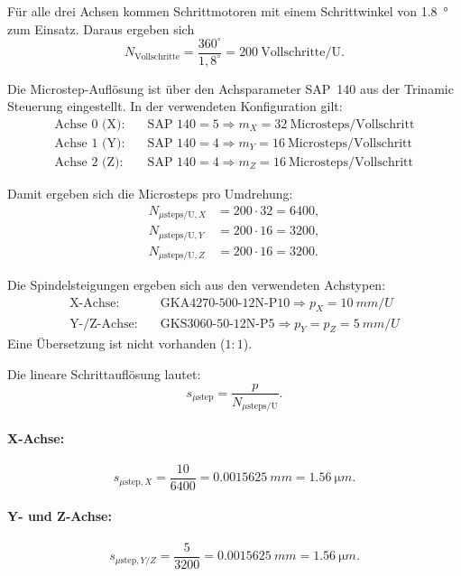 Für alle drei Achsen kommen Schrittmotoren mit einem Schrittwinkel von \SI{1,8}{\degree} zum Einsatz.
Daraus ergeben sich
\begin{equation}
N_\text{Vollschritte}=\frac{360^\circ}{1,8^\circ}=200\ \text{Vollschritte/U}.
\end{equation}

Die Microstep-Auflösung ist über den Achsparameter SAP~140 aus der Trinamic Steuerung eingestellt. In der verwendeten Konfiguration gilt:
\begin{align}
\text{Achse 0 (X):} \quad & \text{SAP 140} = 5 \Rightarrow m_X = 32\ \text{Microsteps/Vollschritt} \\
\text{Achse 1 (Y):} \quad & \text{SAP 140} = 4 \Rightarrow m_Y = 16\ \text{Microsteps/Vollschritt} \\
\text{Achse 2 (Z):} \quad & \text{SAP 140} = 4 \Rightarrow m_Z = 16\ \text{Microsteps/Vollschritt}
\end{align}

Damit ergeben sich die Microsteps pro Umdrehung:
\begin{align}
N_{\mu\text{steps/U},X} &= 200\cdot 32 = 6400,\\
N_{\mu\text{steps/U},Y} &= 200\cdot 16 = 3200,\\
N_{\mu\text{steps/U},Z} &= 200\cdot 16 = 3200.
\end{align}

Die Spindelsteigungen ergeben sich aus den verwendeten Achstypen:
\begin{align}
\text{X-Achse:} \quad & \text{GKA4270-500-12N-P10} \Rightarrow p_X=\SI{10}{mm/U}
 \\
\text{Y-/Z-Achse:} \quad & \text{GKS3060-50-12N-P5} \Rightarrow p_Y=p_Z=\SI{5}{mm/U}
\end{align}
Eine Übersetzung ist nicht vorhanden ($1{:}1$).

Die lineare Schrittauflösung lautet:
\begin{equation}
s_{\mu\text{step}}=\frac{p}{N_{\mu\text{steps/U}}}.
\end{equation}

\paragraph{X-Achse:}
\begin{equation}
s_{\mu\text{step},X}=\frac{10}{6400}
=\SI{0,0015625}{mm}
=\SI{1,56}{\micro m}.
\end{equation}

\paragraph{Y- und Z-Achse:}
\begin{equation}
s_{\mu\text{step},Y/Z}=\frac{5}{3200}
=\SI{0,0015625}{mm}
=\SI{1,56}{\micro m}.
\end{equation}

